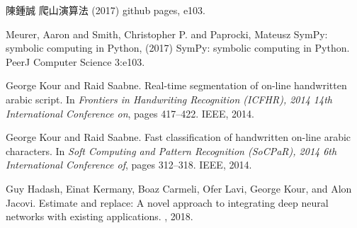 \documentclass{article}
\begin{document}
\begin{thebibliography}{1}

\bibitem{}
陳鍾誠
\newblock 爬山演算法
\newblock (2017) github pages, e103.

Meurer, Aaron and Smith, Christopher P. and Paprocki, Mateusz
\newblock SymPy: symbolic computing in Python,
\newblock (2017) SymPy: symbolic computing in Python. PeerJ Computer Science 3:e103.

George Kour and Raid Saabne.
\newblock Real-time segmentation of on-line handwritten arabic script.
\newblock In {\em Frontiers in Handwriting Recognition (ICFHR), 2014 14th
  International Conference on}, pages 417--422. IEEE, 2014.

George Kour and Raid Saabne.
\newblock Fast classification of handwritten on-line arabic characters.
\newblock In {\em Soft Computing and Pattern Recognition (SoCPaR), 2014 6th
  International Conference of}, pages 312--318. IEEE, 2014.

Guy Hadash, Einat Kermany, Boaz Carmeli, Ofer Lavi, George Kour, and Alon
  Jacovi.
\newblock Estimate and replace: A novel approach to integrating deep neural
  networks with existing applications.
, 2018.

\end{thebibliography}
\end{document}
